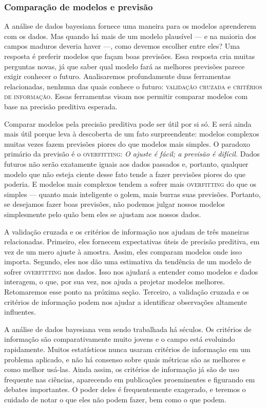 \subsubsection{Comparação de modelos e previsão}

A análise de dados bayesiana fornece uma maneira para os modelos aprenderem com os dados. Mas quando há mais de um modelo plausível — e na maioria dos campos maduros deveria haver —, como devemos escolher entre eles? Uma resposta é preferir modelos que façam boas previsões. Essa resposta cria muitas perguntas novas, já que saber qual modelo fará as melhores previsões parece exigir conhecer o futuro. Analisaremos profundamente duas ferramentas relacionadas, nenhuma das quais conhece o futuro: \textsc{validação cruzada} e \textsc{critérios de informação}. Essas ferramentas visam nos permitir comparar modelos com base na precisão preditiva esperada.

Comparar modelos pela precisão preditiva pode ser útil por si só. E será ainda mais útil porque leva à descoberta de um fato surpreendente: modelos complexos muitas vezes fazem previsões piores do que modelos mais simples. O paradoxo primário da previsão é o \textsc{overfitting}: \textit{O ajuste é fácil; a previsão é difícil.} Dados futuros não serão exatamente iguais aos dados passados e, portanto, qualquer modelo que não esteja ciente desse fato tende a fazer previsões piores do que poderia. E modelos mais complexos tendem a sofrer mais \textsc{overfitting} do que os simples — quanto mais inteligente o golem, mais burras suas previsões. Portanto, se desejamos fazer boas previsões, não podemos julgar nossos modelos simplesmente pelo quão bem eles se ajustam aos nossos dados.

A validação cruzada e os critérios de informação nos ajudam de três maneiras relacionadas. Primeiro, eles fornecem expectativas úteis de precisão preditiva, em vez de um mero ajuste à amostra. Assim, eles comparam modelos onde isso importa. Segundo, eles nos dão uma estimativa da tendência de um modelo de sofrer \textsc{overfitting} nos dados. Isso nos ajudará a entender como modelos e dados interagem, o que, por sua vez, nos ajuda a projetar modelos melhores. Retomaremos esse ponto na próxima seção. Terceiro, a validação cruzada e os critérios de informação podem nos ajudar a identificar observações altamente influentes.

A análise de dados bayesiana vem sendo trabalhada há séculos. Os critérios de informação são comparativamente muito jovens e o campo está evoluindo rapidamente. Muitos estatísticos nunca usaram critérios de informação em um problema aplicado, e não há consenso sobre quais métricas são as melhores e como melhor usá-las. Ainda assim, os critérios de informação já são de uso frequente nas ciências, aparecendo em publicações proeminentes e figurando em debates importantes. O poder deles é frequentemente exagerado, e teremos o cuidado de notar o que eles não podem fazer, bem como o que podem.

